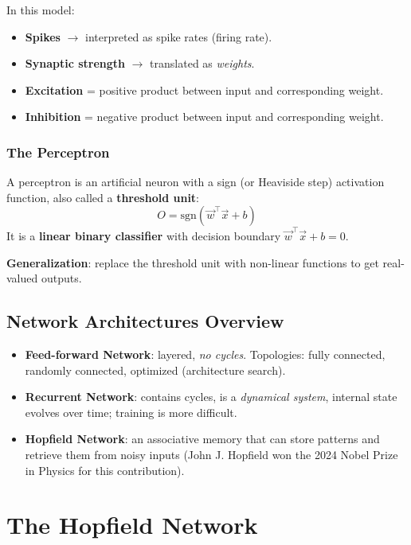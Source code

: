 \documentclass[11pt,a4paper]{article}
\newcommand{\vw}{\vec{w}}
\newcommand{\vx}{\vec{x}}
\newcommand{\sgn}{\text{sgn}}
\begin{document}
In this model:
\begin{itemize}[leftmargin=*]
    \item \textbf{Spikes} $\to$ interpreted as spike rates (firing rate).
    \item \textbf{Synaptic strength} $\to$ translated as \emph{weights}.
    \item \textbf{Excitation} = positive product between input and corresponding weight.
    \item \textbf{Inhibition} = negative product between input and corresponding weight.
\end{itemize}

\subsubsection{The Perceptron}

A perceptron is an artificial neuron with a sign (or Heaviside step) activation function, also called a \textbf{threshold unit}:
\[
O = \sgn(\vw^\top \vx + b)
\]
It is a \textbf{linear binary classifier} with decision boundary $\vw^\top \vx + b = 0$.

\textbf{Generalization}: replace the threshold unit with non-linear functions to get real-valued outputs.

\subsection{Network Architectures Overview}

\begin{itemize}[leftmargin=*]
    \item \textbf{Feed-forward Network}: layered, \emph{no cycles}. Topologies: fully connected, randomly connected, optimized (architecture search).
    \item \textbf{Recurrent Network}: contains cycles, is a \emph{dynamical system}, internal state evolves over time; training is more difficult.
    \item \textbf{Hopfield Network}: an associative memory that can store patterns and retrieve them from noisy inputs (John J. Hopfield won the 2024 Nobel Prize in Physics for this contribution).
\end{itemize}

\newpage
\section{The Hopfield Network}
\end{document}
